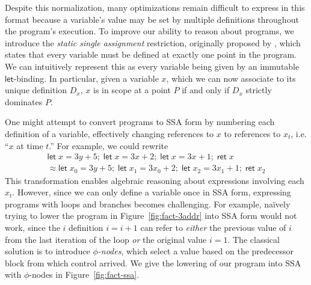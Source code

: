 \documentclass[acmsmall,screen,review]{acmart}
\newcommand{\ms}[1]{\ensuremath{\mathsf{#1}}}
\newcommand{\letexpr}[3]{\ensuremath{\ms{let}\;#1 = #2;\;#3}}
\newcommand{\teqv}{\approx}
\begin{document}
Despite this normalization, many optimizations remain difficult to express in this format because a
variable's value may be set by multiple definitions throughout the program's execution. To improve
our ability to reason about programs, we introduce the \emph{static single assignment} restriction,
originally proposed by \citet{alpern-ssa-original-88}, which states that every variable must be
defined at exactly one point in the program. We can intuitively represent this as every variable
being given by an immutable \ms{let}-binding. In particular, given a variable $x$, which we can now
associate to its unique definition $D_x$, $x$ is in scope at a point $P$ if and only if $D_x$
strictly dominates $P$.

One might attempt to convert programs to SSA form by numbering each definition of a variable,
effectively changing references to $x$ to references to $x_t$, i.e. ``$x$ at time $t$.'' For
example, we could rewrite
\begin{multline}
  \letexpr{x}{3y + 5}{\letexpr{x}{3x + 2}{\letexpr{x}{3x + 1}{\ms{ret}\;x}}}
  \\ \teqv \letexpr{x_0}{3y + 5}{\letexpr{x_1}{3x_0 + 2}{\letexpr{x_2}{3x_1 + 1}{\ms{ret}\;x_2}}}
\end{multline}
This transformation enables algebraic reasoning about expressions involving each $x_t$. However,
since we can only define a variable once in SSA form, expressing programs with loops and branches
becomes challenging. For example, na\"ively trying to lower the program in
Figure~\ref{fig:fact-3addr} into SSA form would not work, since the $i$ definition $i = i + 1$ can
refer to \emph{either} the previous value of $i$ from the last iteration of the loop \emph{or} the
original value $i = 1$. The classical solution is to introduce \emph{$\phi$-nodes}, which select a
value based on the predecessor block from which control arrived. We give the lowering of our program
into SSA with $\phi$-nodes in Figure~\ref{fig:fact-ssa}. 
\end{document}
